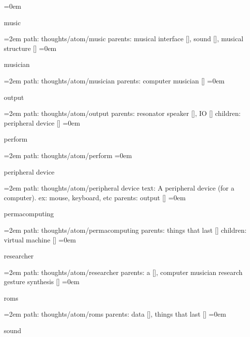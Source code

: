 \leftskip=0em
\par\endgroup
\bigskip
{}
music
\smallskip
\par\begingroup
\leftskip=2em
path: thoughts/atom/music
\smallskip
parents:  musical interface [], sound [], musical structure []
\smallskip
\leftskip=0em
\par\endgroup
\bigskip
{}
musician
\smallskip
\par\begingroup
\leftskip=2em
path: thoughts/atom/musician
\smallskip
parents:  computer musician []
\smallskip
\leftskip=0em
\par\endgroup
\bigskip
{}
output
\smallskip
\par\begingroup
\leftskip=2em
path: thoughts/atom/output
\smallskip
parents:  resonator speaker [], IO []
\smallskip
children: peripheral device []
\smallskip
\leftskip=0em
\par\endgroup
\bigskip
{}
perform
\smallskip
\par\begingroup
\leftskip=2em
path: thoughts/atom/perform
\smallskip
\leftskip=0em
\par\endgroup
\bigskip
{}
peripheral device
\smallskip
\par\begingroup
\leftskip=2em
path: thoughts/atom/peripheral device
\smallskip
text:  A peripheral device (for a computer). ex: mouse, keyboard, etc
\smallskip
parents:  output []
\smallskip
\leftskip=0em
\par\endgroup
\bigskip
{}
permacomputing
\smallskip
\par\begingroup
\leftskip=2em
path: thoughts/atom/permacomputing
\smallskip
parents:  things that last []
\smallskip
children: virtual machine []
\smallskip
\leftskip=0em
\par\endgroup
\bigskip
{}
researcher
\smallskip
\par\begingroup
\leftskip=2em
path: thoughts/atom/researcher
\smallskip
parents:  a [], computer musician research gesture synthesis []
\smallskip
\leftskip=0em
\par\endgroup
\bigskip
{}
roms
\smallskip
\par\begingroup
\leftskip=2em
path: thoughts/atom/roms
\smallskip
parents:  data [], things that last []
\smallskip
\leftskip=0em
\par\endgroup
\bigskip
{}
sound
\smallskip
\par\begingroup

